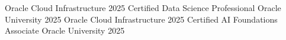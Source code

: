 \documentclass[11pt, a4paper]{awesome-cv}
\begin{document}
\vspace{-0.2cm}
\vspace{0.1cm}
\begin{cvhonors}
  \cvhonor
    {Oracle Cloud Infrastructure 2025 Certified Data Science Professional}
    {Oracle University}
    {}
    {2025}
  \cvhonor
    {Oracle Cloud Infrastructure 2025 Certified AI Foundations Associate}
    {Oracle University}
    {}
    {2025}
\end{cvhonors}


\vspace{-0.2cm}
\vspace{0.1cm}
\begin{cvskills}
\end{cvskills}
\end{document}
